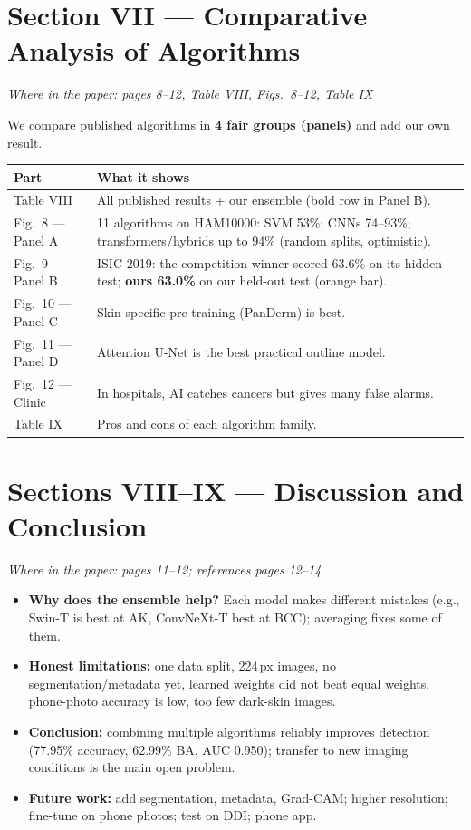 \documentclass[11pt,a4paper]{article}
\newcommand{\where}[1]{{\small\color{hcGray}\textit{Where in the paper: #1}}\par\smallskip}
\begin{document}
\section{Section VII --- Comparative Analysis of Algorithms}
\where{pages 8--12, Table VIII, Figs.~8--12, Table IX}
We compare published algorithms in \textbf{4 fair groups (panels)} and
add our own result.
\par\smallskip
\begin{tabularx}{\linewidth}{@{}L{3.6cm} Y@{}}
\toprule
\textbf{Part} & \textbf{What it shows} \\
\midrule
Table VIII & All published results + our ensemble (bold row in Panel B). \\
Fig.~8 --- Panel A & 11 algorithms on HAM10000: SVM 53\%; CNNs 74--93\%; transformers/hybrids up to 94\% (random splits, optimistic). \\
Fig.~9 --- Panel B & ISIC 2019: the competition winner scored 63.6\% on its hidden test; \textbf{ours 63.0\%} on our held-out test (orange bar). \\
Fig.~10 --- Panel C & Skin-specific pre-training (PanDerm) is best. \\
Fig.~11 --- Panel D & Attention U-Net is the best practical outline model. \\
Fig.~12 --- Clinic & In hospitals, AI catches cancers but gives many false alarms. \\
Table IX & Pros and cons of each algorithm family. \\
\bottomrule
\end{tabularx}

\section{Sections VIII--IX --- Discussion and Conclusion}
\where{pages 11--12; references pages 12--14}
\begin{itemize}
  \item \textbf{Why does the ensemble help?} Each model makes different
        mistakes (e.g., Swin-T is best at AK, ConvNeXt-T best at BCC);
        averaging fixes some of them.
  \item \textbf{Honest limitations:} one data split, 224\,px images, no
        segmentation/metadata yet, learned weights did not beat equal
        weights, phone-photo accuracy is low, too few dark-skin images.
  \item \textbf{Conclusion:} combining multiple algorithms reliably improves
        detection (77.95\% accuracy, 62.99\% BA, AUC 0.950); transfer to
        new imaging conditions is the main open problem.
  \item \textbf{Future work:} add segmentation, metadata, Grad-CAM; higher
        resolution; fine-tune on phone photos; test on DDI; phone app.
\end{itemize}
\end{document}
